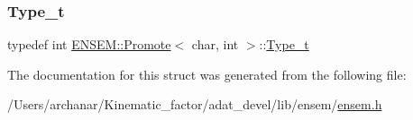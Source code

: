 \subsubsection{\texorpdfstring{Type\_t}{Type\_t}\hspace{0.1cm}{\footnotesize\ttfamily [2/2]}}
{\footnotesize\ttfamily typedef int \mbox{\hyperlink{structENSEM_1_1Promote}{E\+N\+S\+E\+M\+::\+Promote}}$<$ char, int $>$\+::\mbox{\hyperlink{structENSEM_1_1Promote_3_01char_00_01int_01_4_a94b5bc0192c5f4da6285165db6fa7ace}{Type\+\_\+t}}}



The documentation for this struct was generated from the following file\+:\begin{DoxyCompactItemize}
\item 
/\+Users/archanar/\+Kinematic\+\_\+factor/adat\+\_\+devel/lib/ensem/\mbox{\hyperlink{lib_2ensem_2ensem_8h}{ensem.\+h}}\end{DoxyCompactItemize}
